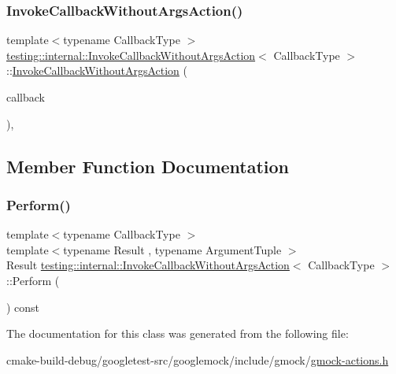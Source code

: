 \subsubsection{\texorpdfstring{InvokeCallbackWithoutArgsAction()}{InvokeCallbackWithoutArgsAction()}}
{\footnotesize\ttfamily template$<$typename Callback\+Type $>$ \\
\mbox{\hyperlink{classtesting_1_1internal_1_1InvokeCallbackWithoutArgsAction}{testing\+::internal\+::\+Invoke\+Callback\+Without\+Args\+Action}}$<$ Callback\+Type $>$\+::\mbox{\hyperlink{classtesting_1_1internal_1_1InvokeCallbackWithoutArgsAction}{Invoke\+Callback\+Without\+Args\+Action}} (\begin{DoxyParamCaption}\item[{Callback\+Type $\ast$}]{callback }\end{DoxyParamCaption})\hspace{0.3cm}{\ttfamily [inline]}, {\ttfamily [explicit]}}



\subsection{Member Function Documentation}
\mbox{\label{classtesting_1_1internal_1_1InvokeCallbackWithoutArgsAction_ac43b186c6daa5f21c8377678c6a9d4ba}} 
\subsubsection{\texorpdfstring{Perform()}{Perform()}}
{\footnotesize\ttfamily template$<$typename Callback\+Type $>$ \\
template$<$typename Result , typename Argument\+Tuple $>$ \\
Result \mbox{\hyperlink{classtesting_1_1internal_1_1InvokeCallbackWithoutArgsAction}{testing\+::internal\+::\+Invoke\+Callback\+Without\+Args\+Action}}$<$ Callback\+Type $>$\+::Perform (\begin{DoxyParamCaption}\item[{const Argument\+Tuple \&}]{ }\end{DoxyParamCaption}) const\hspace{0.3cm}{\ttfamily [inline]}}



The documentation for this class was generated from the following file\+:\begin{DoxyCompactItemize}
\item 
cmake-\/build-\/debug/googletest-\/src/googlemock/include/gmock/\mbox{\hyperlink{gmock-actions_8h}{gmock-\/actions.\+h}}\end{DoxyCompactItemize}

